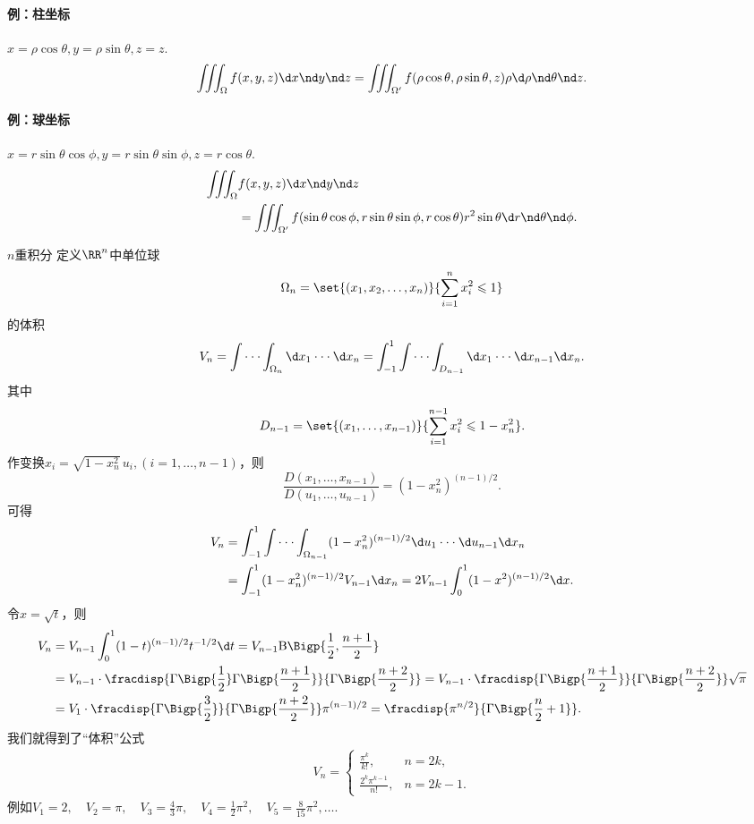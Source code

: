 \paragraph{例：柱坐标}$x=\rho\cos\theta,y=\rho\sin\theta,z=z.$
\[
	\iiint_\Omega f(x,y,z)\d x\nd y\nd z=\iiint_{\Omega'}f(\rho\cos\theta,\rho\sin\theta,z)\rho\d\rho\nd\theta\nd z.
\]
\paragraph{例：球坐标}$x=r\sin\theta\cos\phi,y=r\sin\theta\sin\phi,z=r\cos\theta.$
\begin{align*}
	\iiint_\Omega & f(x,y,z)\d x\nd y\nd z                                                                                   \\
				  & =\iiint_{\Omega'}f(\sin\theta\cos\phi,r\sin\theta\sin\phi,r\cos\theta)r^2\sin\theta\d r\nd\theta\nd\phi.
\end{align*}
\begin{example}{$n$重积分}{}
	定义$\RR^n$中单位球
	\[
		\Omega_n=\set{(x_1,x_2,\ldots,x_n)}{\sum_{i=1}^nx_i^2\leqslant 1}
	\]
	的体积
	\[
		V_n=\int\cdot\cdot\cdot\int_{\Omega_n}\d x_1\cdot\cdot\cdot\d x_n=\int_{-1}^1\int\cdot\cdot\cdot\int_{D_{n-1}}\d x_1\cdot\cdot\cdot\d x_{n-1}\d x_n.
	\]
	其中
	\[
		D_{n-1}=\set{(x_1,\ldots,x_{n-1})}{\sum_{i=1}^{n-1}x_i^2\leqslant 1-x_n^2}.
	\]
	作变换$x_i=\sqrt{1-x_n^2}\,u_i,(i=1,\ldots,n-1)$，则
	\[
		\frac{D(x_1,\ldots,x_{n-1})}{D(u_1,\ldots,u_{n-1})}=(1-x_n^2)^{(n-1)/2}.
	\]
	可得
	\begin{align*}
		V_n & =\int_{-1}^1\int\cdot\cdot\cdot\int_{\Omega_{n-1}}(1-x_n^2)^{(n-1)/2}\d u_1\cdot\cdot\cdot\d u_{n-1}\d x_n \\
			& =\int_{-1}^1(1-x_n^2)^{(n-1)/2}V_{n-1}\d x_n=2V_{n-1}\int_0^1(1-x^2)^{(n-1)/2}\d x.
	\end{align*}
	令$x=\sqrt t$，则
	\begin{align*}
		V_n & =V_{n-1}\int_0^1(1-t)^{(n-1)/2}t^{-1/2}\d t=V_{n-1}\text B\Bigp{\frac12,\frac{n+1}2}\\
			& =V_{n-1}\cdot\fracdisp{\Gamma\Bigp{\frac12}\Gamma\Bigp{\frac{n+1}2}}{\Gamma\Bigp{\frac{n+2}2}}=V_{n-1}\cdot\fracdisp{\Gamma\Bigp{\frac{n+1}2}}{\Gamma\Bigp{\frac{n+2}2}}\sqrt\pi \\
			& =V_1\cdot\fracdisp{\Gamma\Bigp{\frac32}}{\Gamma\Bigp{\frac{n+2}2}}\pi^{(n-1)/2}=\fracdisp{\pi^{n/2}}{\Gamma\Bigp{\frac n2+1}}.
	\end{align*}
	我们就得到了“体积”公式
	\begin{align}
		V_n=
		\begin{cases}
			\frac{\pi^k}{k!},        & n=2k,   \\[
		2ex]
			\frac{2^k\pi^{k-1}}{n!}, & n=2k-1.
		\end{cases}
	\end{align}
	例如$V_1=2,\quad V_2=\pi,\quad V_3=\frac 43\pi,\quad V_4=\frac 12\pi^2,\quad V_5=\frac 8{15}\pi^2,\ldots.$
\end{example}
